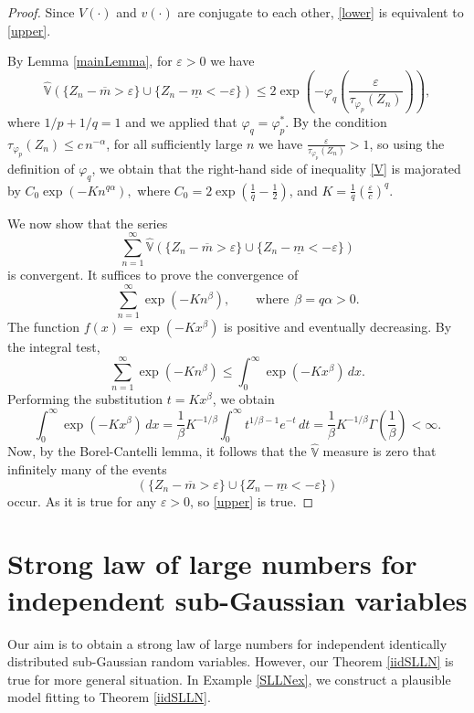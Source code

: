 \documentclass[12pt]{article}
\theoremstyle{definition}
\theoremstyle{remark}
\numberwithin{equation}{section}
\def\Vh{{\hat{\mathbb{V}}}}
\begin{document}
\begin{proof}
Since $V(\cdot)$ and $v(\cdot)$ are conjugate to each other, \eqref{lower} is equivalent to \eqref{upper}.

By Lemma \ref{mainLemma}, for $\varepsilon>0$ we have
\begin{equation}  \label{V}
\Vh\left( \{ Z_n-\overline{m} > \varepsilon \} \cup \{ Z_n-\underline{m} < -\varepsilon \} \right)  
\le 2 \exp\left(-\varphi_q\left(\frac{\varepsilon}{\tau_{\varphi_p}(Z_n)}\right)\right) ,
\end{equation}
where $1/p+1/q=1$ and we applied that  $\varphi_q=\varphi_p^{*}$.
%
By the condition $\tau_{\varphi_p}\!( Z_n )\le c\, n^{-\alpha}$, 
for all sufficiently large $n$ we have $\frac{\varepsilon}{\tau_{\varphi_p}(Z_n)}>1$, so using the definition of
$\varphi_q$, we obtain that the right-hand side of inequality \eqref{V} is majorated by
$C_0\exp\!\left(-K n^{q\alpha}\right),$ 
where $C_0= 2 \exp\!\left(\frac{1}{q}-\frac{1}{2}\right)$,
and $K=\frac{1}{q}\left(\frac{\varepsilon}{c}\right)^q$.

We now show that the series
\[
\sum_{n=1}^{\infty} \Vh\left( \{ Z_n-\overline{m} > \varepsilon \} \cup \{ Z_n-\underline{m} < -\varepsilon \} \right) 
\]
is convergent. 
It suffices to prove the convergence of
\[
\sum_{n=1}^{\infty}\exp\!\left(-K n^{\beta}\right),
\qquad {\text{where}} \ \ \beta=q\alpha>0.
\]
The function $f(x)=\exp(-Kx^\beta)$ is positive and eventually decreasing.
By the integral test,
\[
\sum_{n=1}^{\infty}\exp(-K n^\beta)
\le
\int_{0}^{\infty}\exp(-Kx^\beta)\,dx.
\]
Performing the substitution $t=Kx^\beta$, we obtain
\[
\int_{0}^{\infty}\exp(-Kx^\beta)\,dx
=
\frac{1}{\beta}K^{-1/\beta}
\int_{0}^{\infty} t^{1/\beta-1}e^{-t}\,dt
=
\frac{1}{\beta}K^{-1/\beta}
\Gamma\!\left(\frac{1}{\beta}\right)
<\infty.
\]
Now, by the Borel-Cantelli lemma, it follows that the $\Vh$ measure is zero that infinitely many of the events
$$
\left( \{ Z_n-\overline{m} > \varepsilon \} \cup \{ Z_n-\underline{m} < -\varepsilon \} \right)
$$
occur.
As it is true for any $\varepsilon>0$, so \eqref{upper} is true.
\end{proof}

\section{Strong law of large numbers for independent sub-Gaussian variables}
\label{Chap_slln}
%
Our aim is to obtain a strong law of large numbers for independent identically distributed sub-Gaussian random variables.
However, our Theorem \ref{iidSLLN} is true for more general situation.
In Example \ref{SLLNex}, we construct a plausible model fitting to Theorem \ref{iidSLLN}.
\end{document}
